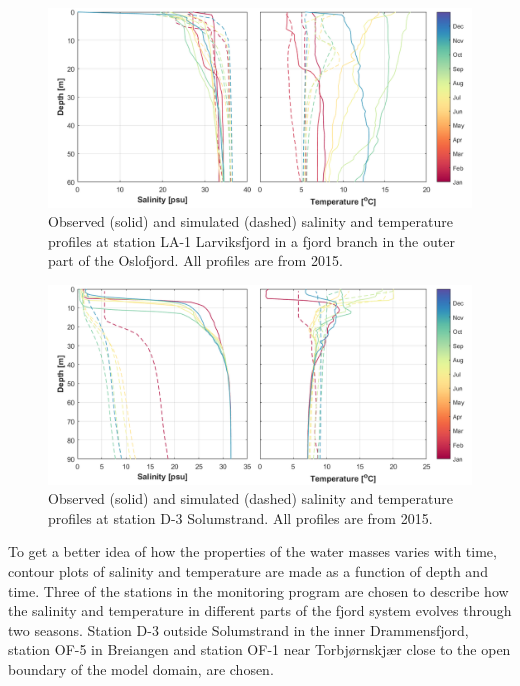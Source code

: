 \begin{figure}[tbh]
	\centerline{
		\includegraphics*[trim=0cm 0cm 0cm 0cm,clip=true,width=\textwidth]{Figurer/CTD_LA-1} }
	\caption{\small Observed (solid) and simulated (dashed) salinity and temperature profiles at station LA-1 Larviksfjord in a fjord branch in the outer part of the Oslofjord. All profiles are from 2015.}
	\label{fig:CTD_LA-1}
\end{figure}

\begin{figure}[tbh]
	\centerline{
		\includegraphics*[trim=0cm 0cm 0cm 0cm,clip=true,width=\textwidth]{Figurer/CTD_D-3}}
	\caption{\small Observed (solid) and simulated (dashed) salinity and temperature profiles at station D-3 Solumstrand. All profiles are from 2015.}
	\label{fig:CTD_D-3}
\end{figure}

To get a better idea of how the properties of the water masses varies with time, contour plots of salinity and temperature are made as a function of depth and time. Three of the stations in the monitoring program are chosen to describe how the salinity and temperature in different parts of the fjord system evolves through two seasons. Station D-3 outside Solumstrand in the inner Drammensfjord, station OF-5 in Breiangen and station OF-1 near Torbj{\o}rnskj{\ae}r close to the open boundary of the model domain, are chosen.

